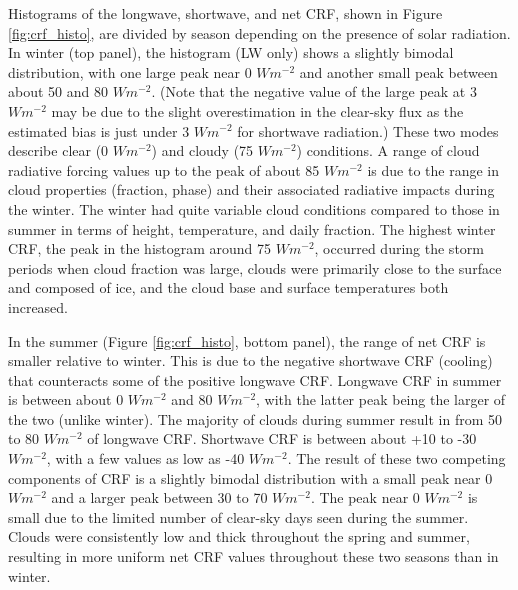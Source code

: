 Histograms of the longwave, shortwave, and net CRF, shown in Figure \ref{fig:crf_histo}, are divided by season depending on the presence of solar radiation. In winter (top panel), the histogram (LW only) shows a slightly bimodal distribution, with one large peak near 0 $W m^{-2}$ and another small peak between about 50 and 80 $W m^{-2}$. (Note that the negative value of the large peak at 3 $W m^{-2}$ may be due to the slight overestimation in the clear-sky flux as the estimated bias is just under 3 $Wm^{-2}$ for shortwave radiation.) These two modes describe clear (0 $W m^{-2}$) and cloudy (75 $W m^{-2}$) conditions. A range of cloud radiative forcing values up to the peak of about 85 $W m^{-2}$ is due to the range in cloud properties (fraction, phase) and their associated radiative impacts during the winter. The winter had quite variable cloud conditions compared to those in summer in terms of height, temperature, and daily fraction. The highest winter CRF, the peak in the histogram around 75 $W m^{-2}$, occurred during the storm periods when cloud fraction was large, clouds were primarily close to the surface and composed of ice, and the cloud base and surface temperatures both increased.  

In the summer (Figure \ref{fig:crf_histo}, bottom panel), the range of net CRF is smaller relative to winter. This is due to the negative shortwave CRF (cooling) that counteracts some of the positive longwave CRF. Longwave CRF in summer is between about 0 $Wm^{-2}$ and 80 $Wm^{-2}$, with the latter peak being the larger of the two (unlike winter). The majority of clouds during summer result in from 50 to 80 $Wm^{-2}$ of longwave CRF. Shortwave CRF is between about +10 to -30 $Wm^{-2}$, with a few values as low as -40 $Wm^{-2}$. The result of these two competing components of CRF is a slightly bimodal distribution with a small peak near 0 $Wm^{-2}$ and a larger peak between 30 to 70 $Wm^{-2}$. The peak near 0 $Wm^{-2}$ is small due to the limited number of clear-sky days seen during the summer. Clouds were consistently low and thick throughout the spring and summer, resulting in more uniform net CRF values throughout these two seasons than in winter.

